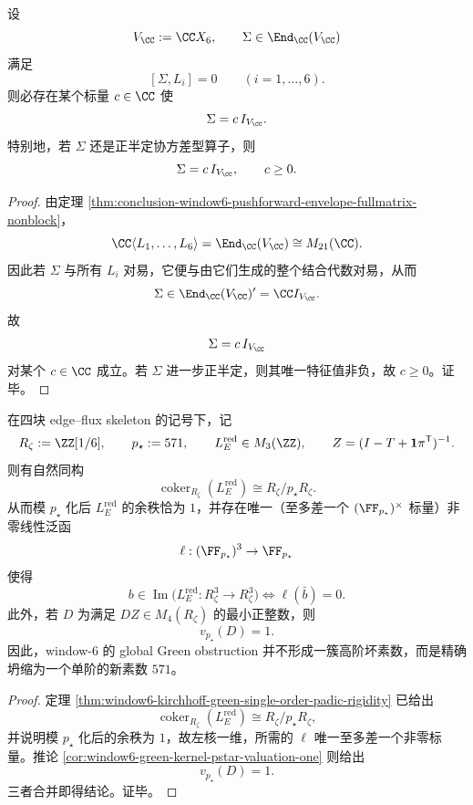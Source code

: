 \begin{theorem}\label{thm:conclusion-window6-pushforward-equivariant-quadratic-scalar-rigidity}
设
\[
V_{\CC}:=\CC X_6,
\qquad
\Sigma\in \End_{\CC}(V_{\CC})
\]
满足
\[
[\Sigma,L_i]=0
\qquad (i=1,\dots,6).
\]
则必存在某个标量 \(c\in\CC\) 使
\[
\Sigma=c\,I_{V_{\CC}}.
\]
特别地，若 \(\Sigma\) 还是正半定协方差型算子，则
\[
\Sigma=c\,I_{V_{\CC}},
\qquad
c\ge 0.
\]
\end{theorem}
\begin{proof}
由定理 \ref{thm:conclusion-window6-pushforward-envelope-fullmatrix-nonblock}，
\[
\CC\langle L_1,\dots,L_6\rangle=\End_{\CC}(V_{\CC})\cong M_{21}(\CC).
\]
因此若 \(\Sigma\) 与所有 \(L_i\) 对易，它便与由它们生成的整个结合代数对易，从而
\[
\Sigma\in \End_{\CC}(V_{\CC})'=\CC I_{V_{\CC}}.
\]
故
\[
\Sigma=c\,I_{V_{\CC}}
\]
对某个 \(c\in\CC\) 成立。若 \(\Sigma\) 进一步正半定，则其唯一特征值非负，故 \(c\ge 0\)。证毕。
\end{proof}

\begin{theorem}\label{thm:conclusion-window6-kirchhoff-green-singleprime-globalization}
在四块 edge--flux skeleton 的记号下，记
\[
R_\zeta:=\ZZ[1/6],
\qquad
p_\star:=571,
\qquad
L_E^{\mathrm{red}}\in M_3(\ZZ),
\qquad
Z=(I-T+\mathbf 1\pi^{\mathsf T})^{-1}.
\]
则有自然同构
\[
\operatorname{coker}_{R_\zeta}(L_E^{\mathrm{red}})
\cong
R_\zeta/p_\star R_\zeta.
\]
从而模 \(p_\star\) 化后 \(L_E^{\mathrm{red}}\) 的余秩恰为 \(1\)，并存在唯一（至多差一个 \((\FF_{p_\star})^\times\) 标量）非零线性泛函
\[
\ell:(\FF_{p_\star})^3\to \FF_{p_\star}
\]
使得
\[
b\in \operatorname{Im}\bigl(L_E^{\mathrm{red}}:R_\zeta^3\to R_\zeta^3\bigr)
\iff
\ell(\bar b)=0.
\]
此外，若 \(D\) 为满足 \(DZ\in M_4(R_\zeta)\) 的最小正整数，则
\[
v_{p_\star}(D)=1.
\]
因此，window-\(6\) 的 global Green obstruction 并不形成一簇高阶坏素数，而是精确坍缩为一个单阶的新素数 \(571\)。
\end{theorem}
\begin{proof}
定理 \ref{thm:window6-kirchhoff-green-single-order-padic-rigidity} 已给出
\[
\operatorname{coker}_{R_\zeta}(L_E^{\mathrm{red}})
\cong
R_\zeta/p_\star R_\zeta,
\]
并说明模 \(p_\star\) 化后的余秩为 \(1\)，故左核一维，所需的 \(\ell\) 唯一至多差一个非零标量。推论 \ref{cor:window6-green-kernel-pstar-valuation-one} 则给出
\[
v_{p_\star}(D)=1.
\]
三者合并即得结论。证毕。
\end{proof}

